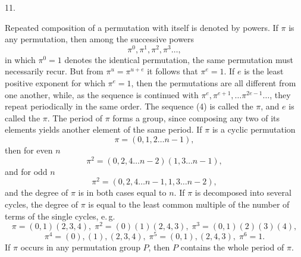 11. 

Repeated composition of a permutation with itself is denoted by
powers. If $\pi$ is any permutation, then among the successive
powers
\[
\pi^0, \pi^1, \pi^2, \pi^3 \ldots,
\]
in which $\pi^0 = 1$ denotes the identical permutation, the same
permutation must necessarily recur. But from $\pi^u = \pi^{u+e}$ it follows
that $\pi^e = 1$. If $e$ is the least positive exponent for which $\pi^e = 1$,
then the permutations
are all different from one another, while, as the sequence is continued with
$\pi^e, \pi^{e+1}, \ldots \pi^{2e-1} \ldots$, they repeat periodically in the same
order. The sequence (4) is called the 
$\pi$, and $e$ is called the  $\pi$. The period
of $\pi$ forms a group, since composing any two of its elements
yields another element of the same period.
If $\pi$ is a cyclic permutation
\[
\pi = (0, 1, 2 \ldots n - 1),
\]
then for even $n$
\[
\pi^2 = (0, 2, 4 \ldots n - 2) (1, 3 \ldots n - 1),
\]
and for odd $n$
\[
\pi^2 = (0, 2, 4 \ldots n - 1, 1, 3 \ldots n - 2),
\]
and the degree of $\pi$ is in both cases equal to $n$.
If $\pi$ is decomposed into several cycles, the degree of $\pi$
is equal to the least common multiple of the number of terms of the single cycles, e.\,g.
\[
\pi = (0, 1) (2, 3, 4), \; \pi^2 = (0) (1) (2, 4, 3), \; \pi^3 = (0, 1) (2) (3) (4),
\]
\[
\pi^4 = (0), (1), (2, 3, 4), \; \pi^5 = (0, 1), (2, 4, 3), \; \pi^6 = 1.
\]
If $\pi$ occurs in any permutation group $P$,
then $P$ contains the whole period of $\pi$.
